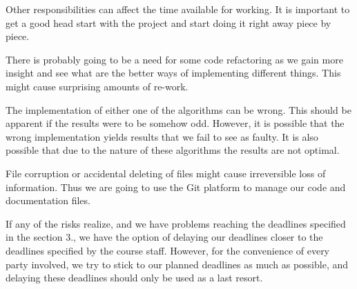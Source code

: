 \documentclass[twoside]{article}
\begin{document}
\begin{multicols}{2}
Other responsibilities can affect the time available for working. It is important to get a good head start with the project and start doing it right away piece by piece.

There is probably going to be a need for some code refactoring as we gain more insight and see what are the better ways of implementing different things. This might cause surprising amounts of re-work.

The implementation of either one of the algorithms can be wrong. This should be apparent if the results were to be somehow odd. However, it is possible that the wrong implementation yields results that we fail to see as faulty. It is also possible that due to the nature of these algorithms the results are not optimal.

File corruption or accidental deleting of files might cause irreversible loss of information. Thus we are going to use the Git platform to manage our code and documentation files.

If any of the risks realize, and we have problems reaching the deadlines specified in the section 3., we have the option of delaying our deadlines closer to the deadlines specified by the course staff. However, for the convenience of every party involved, we try to stick to our planned deadlines as much as possible, and delaying these deadlines should only be used as a last resort.


 


\end{multicols}
\end{document}
